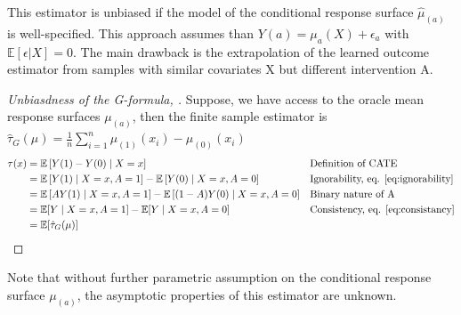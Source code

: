 \documentclass[french,12pt,twoside,a4paper]{book}
\newtheorem{proof}{Proof}
\begin{document}
\begin{appendices}
  This estimator is unbiased if the model of the conditional response surface
  $\hat \mu_{(a)}$ is well-specified. This approach assumes than $Y(a) =
    \mu_a(X) + \epsilon_a$ with $\mathbb E[\epsilon|X] = 0$. The main drawback is
  the extrapolation of the learned outcome estimator from samples with similar
  covariates X but different intervention A.

  \begin{proof}[Unbiasdness of the G-formula, \citep{robins_role_1986}]
    Suppose, we have access to the oracle mean response surfaces $\mu_{(a)}$,
    then the finite sample estimator is $\hat{\tau}_G(\mu) = \frac{1}{n}
      \sum_{i=1}^n  \mu_{(1)}(x_i) -  \mu_{(0)}(x_i)$
    \begin{align*}
      \tau(x) & =\mathbb{E}\left[Y(1)-Y(0) \mid X=x\right]                                                   &  & \text{Definition of CATE}                      \\
              & =\mathbb{E}\left[Y(1) \mid X=x, A=1\right]-\mathbb{E}\left[Y(0) \mid X=x, A=0\right]         &  & \text{Ignorability, eq. \ref{eq:ignorability}} \\
              & =\mathbb{E}\left[A Y(1) \mid X=x, A=1\right]-\mathbb{E}\left[(1-A) Y(0) \mid X=x, A=0\right] &  & \text{Binary nature of A}                      \\
              & =\mathbb{E}[Y \mid X=x, A=1]-\mathbb{E}[Y \mid X=x, A=0]                                     &  & \text{Consistency, eq. \ref{eq:consistancy}}   \\
              & =\mathbb{E}[\hat{\tau}_G(\mu)]                                                               &  &
    \end{align*}
  \end{proof}

  Note that without further parametric assumption on the conditional response
  surface $\mu_{(a)}$, the asymptotic properties of this estimator are unknown.


\end{appendices}
\end{document}
